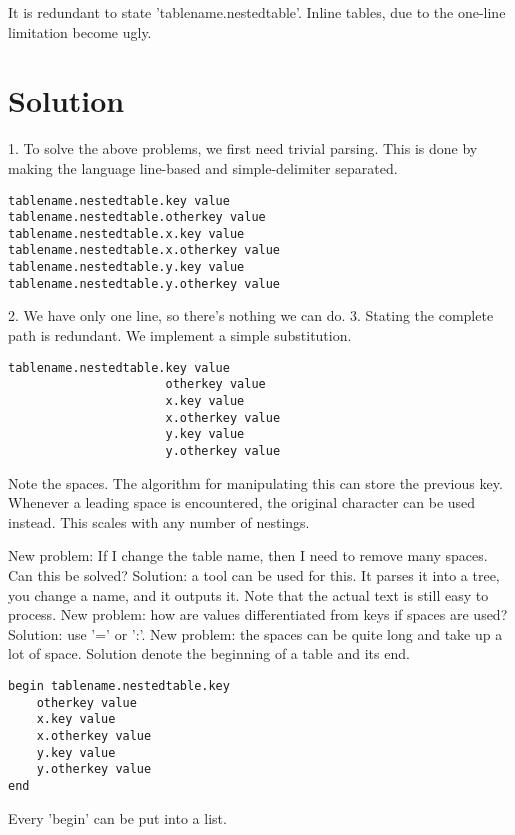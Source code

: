 \documentclass[listof=totoc]{article}
\begin{document}
It is redundant to state 'tablename.nestedtable'. Inline tables, due to the one-line limitation become ugly.

\section{Solution}
1. To solve the above problems, we first need trivial parsing. This is done by making the language line-based and simple-delimiter separated.

\begin{verbatim}
tablename.nestedtable.key value
tablename.nestedtable.otherkey value
tablename.nestedtable.x.key value
tablename.nestedtable.x.otherkey value
tablename.nestedtable.y.key value
tablename.nestedtable.y.otherkey value
\end{verbatim}

2. We have only one line, so there's nothing we can do.
3. Stating the complete path is redundant. We implement a simple substitution.

\begin{verbatim}
tablename.nestedtable.key value
                      otherkey value
                      x.key value
                      x.otherkey value
                      y.key value
                      y.otherkey value
\end{verbatim}


Note the spaces. The algorithm for manipulating this can store the previous key. Whenever a leading space is
encountered, the original character can be used instead. This scales with any number of nestings.

New problem: If I change the table name, then I need to remove many spaces. Can this be solved?
Solution: a tool can be used for this. It parses it into a tree, you change a name, and it outputs it. Note that the actual text is still easy to process.
New problem: how are values differentiated from keys if spaces are used?
Solution: use '=' or ':'.
New problem: the spaces can be quite long and take up a lot of space.
Solution denote the beginning of a table and its end.

\begin{verbatim}
begin tablename.nestedtable.key
	otherkey value
	x.key value
	x.otherkey value
	y.key value
	y.otherkey value
end
\end{verbatim}

Every 'begin' can be put into a list.
\end{document}
